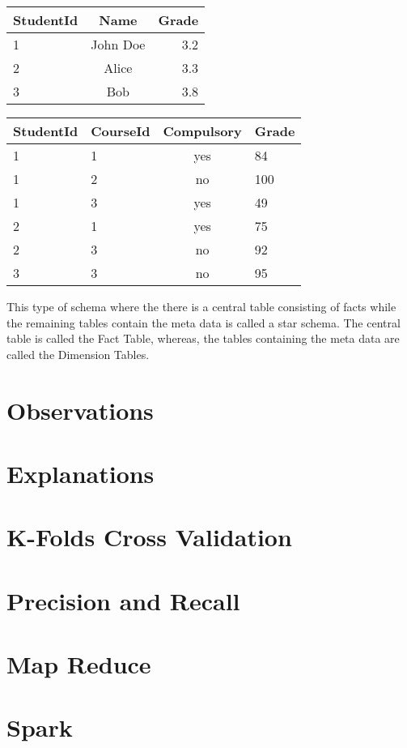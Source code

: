 \begin{center}
  \begin{tabular}{ | l | c | r | }
    \hline
    \textbf{StudentId} & \textbf{Name} & \textbf{Grade} \\ \hline
    1 & John Doe & 3.2 \\ \hline
    2 & Alice & 3.3 \\ \hline
    3 & Bob & 3.8 \\
    \hline
  \end{tabular}
\end{center}
\label{tbl:student}

\begin{center}
  \begin{tabular}{ | l | l | c | l | }
    \hline
    \textbf{StudentId} & \textbf{CourseId} & \textbf{Compulsory} & \textbf{Grade} \\ \hline
    1 & 1 & yes & 84 \\ \hline
    1 & 2 & no & 100 \\ \hline
    1 & 3 & yes & 49 \\ \hline
    2 & 1 & yes & 75 \\ \hline
    2 & 3 & no & 92 \\ \hline
    3 & 3 & no & 95 \\
    \hline
  \end{tabular}
\end{center}
\label{tbl:fact}

This type of schema where the there is a central table consisting of facts while the remaining tables contain the meta data is called a star schema. The central table is called the Fact Table, whereas, the tables containing the meta data are called the Dimension Tables.

\section{Observations}

\section{Explanations}

\section{K-Folds Cross Validation}

\section{Precision and Recall}

\section{Map Reduce}

\section{Spark}

